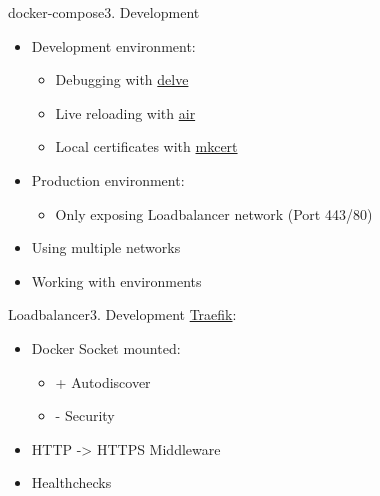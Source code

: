 \documentclass[aspectratio=169,20pt]{beamer}
\begin{document}
\begin{frame}{docker-compose}{3. Development}
	\begin{itemize}
		\item{Development environment:}
		\begin{itemize}
			\item{Debugging with \href{https://github.com/go-delve/delve}{delve}}
			\item{Live reloading with \href{https://github.com/cosmtrek/air}{air}}
			\item{Local certificates with \href{https://github.com/FiloSottile/mkcert}{mkcert}}
		\end{itemize}
		\item{Production environment:}
		\begin{itemize}
			\item{Only exposing Loadbalancer network (Port 443/80)}
		\end{itemize}
		\item{Using multiple networks}
		\item{Working with environments}
	\end{itemize}
\end{frame}

\begin{frame}{Loadbalancer}{3. Development}
	\underline{Traefik}:
	\begin{itemize}
		\item{Docker Socket mounted:}
		\begin{itemize}
			\item{+ Autodiscover}
			\item{- Security}
		\end{itemize}
		\item{HTTP -> HTTPS Middleware}
		\item{Healthchecks}
	\end{itemize}
\end{frame}
\end{document}
